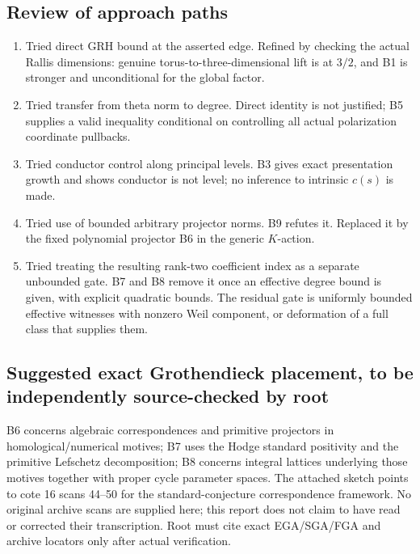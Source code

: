 \documentclass[11pt,a4paper]{article}
\providecommand{\tightlist}{\setlength{\itemsep}{0pt}\setlength{\parskip}{0pt}}
\theoremstyle{definition}
\begin{document}
\subsection{Review of approach paths}\label{review-of-approach-paths}

\begin{enumerate}
\def\labelenumi{\arabic{enumi}.}
\tightlist
\item
  Tried direct GRH bound at the asserted edge. Refined by checking the actual Rallis dimensions: genuine torus-to-three-dimensional lift is at \(3/2\), and B1 is stronger and unconditional for the global factor.
\item
  Tried transfer from theta norm to degree. Direct identity is not justified; B5 supplies a valid inequality conditional on controlling all actual polarization coordinate pullbacks.
\item
  Tried conductor control along principal levels. B3 gives exact presentation growth and shows conductor is not level; no inference to intrinsic \(c(s)\) is made.
\item
  Tried use of bounded arbitrary projector norms. B9 refutes it. Replaced it by the fixed polynomial projector B6 in the generic \(K\)-action.
\item
  Tried treating the resulting rank-two coefficient index as a separate unbounded gate. B7 and B8 remove it once an effective degree bound is given, with explicit quadratic bounds. The residual gate is uniformly bounded effective witnesses with nonzero Weil component, or deformation of a full class that supplies them.
\end{enumerate}

\subsection{Suggested exact Grothendieck placement, to be independently source-checked by root}\label{suggested-exact-grothendieck-placement-to-be-independently-source-checked-by-root}

B6 concerns algebraic correspondences and primitive projectors in homological/numerical motives; B7 uses the Hodge standard positivity and the primitive Lefschetz decomposition; B8 concerns integral lattices underlying those motives together with proper cycle parameter spaces. The attached sketch points to cote 16 scans 44--50 for the standard-conjecture correspondence framework. No original archive scans are supplied here; this report does not claim to have read or corrected their transcription. Root must cite exact EGA/SGA/FGA and archive locators only after actual verification.
\end{document}

